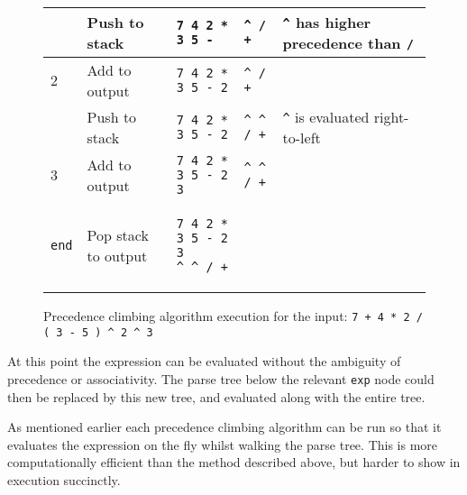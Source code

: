 \begin{figure}[H]
\begin{center}
\begin{tabular}{| m{1.2cm} | m{3.1cm} | m{3.6cm} | m{2.3cm} | m{3.5cm} |}
            \hline
            $\hat{}$ & Push to stack & \verb|7 4 2 * 3 5 -| & \verb|^ / +| & \verb|^| has higher precedence than \verb|/|\\
            \hline
            $2$ & Add to output & \verb|7 4 2 * 3 5 - 2| & \verb|^ / +| &\\
            \hline
            $\hat{}$ & Push to stack & \verb|7 4 2 * 3 5 - 2| & \verb|^ ^ / +| & \verb|^| is evaluated right-to-left\\
            \hline
            $3$ & Add to output & \verb|7 4 2 * 3 5 - 2 3| & \verb|^ ^ / +| &\\
            \hline
            \verb|end| & Pop stack to output & \begin{verbatim}
7 4 2 * 3 5 - 2 3
^ ^ / +
            \end{verbatim} & & \\
            \hline
        \end{tabular}
    \cprotect\caption{\label{fig:4.7}Precedence climbing algorithm execution for the input: \verb|7 + 4 * 2 / ( 3 - 5 ) ^ 2 ^ 3|}
    \end{center}
\end{figure}

At this point the expression can be evaluated without the ambiguity of precedence or associativity. The parse tree below the relevant \verb|exp| node could then be replaced by this new tree, and evaluated along with the entire tree.

As mentioned earlier each precedence climbing algorithm can be run so that it evaluates the expression on the fly whilst walking the parse tree. This is more computationally efficient than the method described above, but harder to show in execution succinctly.
